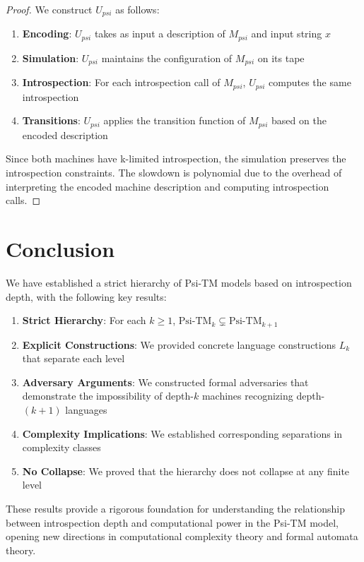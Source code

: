 \documentclass[11pt]{article}
\begin{document}
\begin{proof}
We construct $U_{psi}$ as follows:

\begin{enumerate}
\item \textbf{Encoding}: $U_{psi}$ takes as input a description of $M_{psi}$ and input string $x$
\item \textbf{Simulation}: $U_{psi}$ maintains the configuration of $M_{psi}$ on its tape
\item \textbf{Introspection}: For each introspection call of $M_{psi}$, $U_{psi}$ computes the same introspection
\item \textbf{Transitions}: $U_{psi}$ applies the transition function of $M_{psi}$ based on the encoded description
\end{enumerate}

Since both machines have k-limited introspection, the simulation preserves the introspection constraints. The slowdown is polynomial due to the overhead of interpreting the encoded machine description and computing introspection calls.
\end{proof}

\section{Conclusion}

We have established a strict hierarchy of Psi-TM models based on introspection depth, with the following key results:

\begin{enumerate}
\item \textbf{Strict Hierarchy}: For each $k \geq 1$, $\text{Psi-TM}_k \subsetneq \text{Psi-TM}_{k+1}$
\item \textbf{Explicit Constructions}: We provided concrete language constructions $L_k$ that separate each level
\item \textbf{Adversary Arguments}: We constructed formal adversaries that demonstrate the impossibility of depth-$k$ machines recognizing depth-$(k+1)$ languages
\item \textbf{Complexity Implications}: We established corresponding separations in complexity classes
\item \textbf{No Collapse}: We proved that the hierarchy does not collapse at any finite level
\end{enumerate}

These results provide a rigorous foundation for understanding the relationship between introspection depth and computational power in the Psi-TM model, opening new directions in computational complexity theory and formal automata theory.
\end{document}

